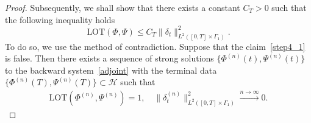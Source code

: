 \documentclass[10pt]{elsarticle}
\begin{document}
\begin{proof}
Subsequently, we shall show that there exists a constant $C_T>0$ such that the following inequality holds
\begin{equation}\label{step4_1}
	\textrm{LOT}(\Phi, \Psi)\leq C_T \|\delta_{t}\|^2_{L^2([0, T]\times \Gamma_1)}.
\end{equation}
To do so, we use the method of contradiction. 
Suppose that the claim~\eqref{step4_1} is false. Then there exists a sequence of strong solutions $\{\Phi^{(n)}(t), \Psi^{(n)}(t)\}$ to the backward system~\eqref{adjoint} with the terminal data 
$\{\Phi^{(n)}(T), \Psi^{(n)}(T)\}\subset\mathcal{H}$ such that
\begin{equation} \label{false}
\begin{aligned}
	\textrm{LOT}(\Phi^{(n)}, \Psi^{(n)}) =1, \quad \|\delta^{(n)}_{t}\|^2_{L^2([0, T]\times \Gamma_1)}\xrightarrow{n\rightarrow \infty} 0.
\end{aligned}
\end{equation}


\end{proof}
\end{document}
